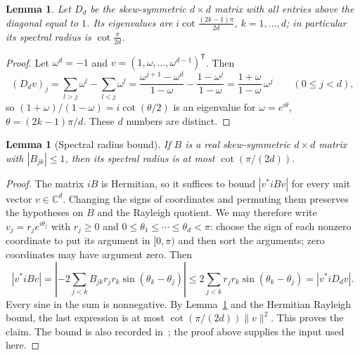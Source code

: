 \documentclass[11pt,a4paper,reqno]{amsart}
\newtheorem{lemma}[theorem]{Lemma}
\theoremstyle{remark}
\numberwithin{equation}{section}
\newcommand{\T}{\mathsf{T}}
\newcommand{\C}{\mathbb{C}}
\begin{document}
\begin{lemma}\label{lem:Dd}
Let $D_d$ be the skew-symmetric $d\times d$ matrix with all entries above the diagonal equal to $1$. Its eigenvalues are $i\cot\frac{(2k-1)\pi}{2d}$, $k=1,\dots,d$; in particular its spectral radius is $\cot\frac{\pi}{2d}$.
\end{lemma}

\begin{proof}
Let $\omega^d=-1$ and $v=(1,\omega,\dots,\omega^{d-1})^\T$. Then
\[
(D_dv)_j=\sum_{l>j}\omega^{l}-\sum_{l<j}\omega^{l}=\frac{\omega^{j+1}-\omega^d}{1-\omega}-\frac{1-\omega^j}{1-\omega}=\frac{1+\omega}{1-\omega}\,\omega^j\qquad(0\le j<d),
\]
so $(1+\omega)/(1-\omega)=i\cot(\theta/2)$ is an eigenvalue for $\omega=e^{i\theta}$, $\theta=(2k-1)\pi/d$. These $d$ numbers are distinct.
\end{proof}

\begin{lemma}[Spectral radius bound]\label{lem:radiusbound}
If $B$ is a real skew-symmetric $d\times d$ matrix with $|B_{jk}|\le1$, then its spectral radius is at most $\cot(\pi/(2d))$.
\end{lemma}

\begin{proof}
The matrix $iB$ is Hermitian, so it suffices to bound $|v^*iBv|$ for every unit vector $v\in\C^d$. Changing the signs of coordinates and permuting them preserves the hypotheses on $B$ and the Rayleigh quotient. We may therefore write $v_j=r_je^{i\theta_j}$ with $r_j\ge0$ and $0\le\theta_1\le\cdots\le\theta_d<\pi$: choose the sign of each nonzero coordinate to put its argument in $[0,\pi)$ and then sort the arguments; zero coordinates may have argument zero. Then
\[
|v^*iBv|=\left|-2\sum_{j<k}B_{jk}r_jr_k\sin(\theta_k-\theta_j)\right|
\le 2\sum_{j<k}r_jr_k\sin(\theta_k-\theta_j)=|v^*iD_dv|.
\]
Every sine in the sum is nonnegative. By Lemma~\ref{lem:Dd} and the Hermitian Rayleigh bound, the last expression is at most $\cot(\pi/(2d))\|v\|^2$. This proves the claim. The bound is also recorded in~\cite[Lemma~12]{GKLV}; the proof above supplies the input used here.
\end{proof}
\end{document}
